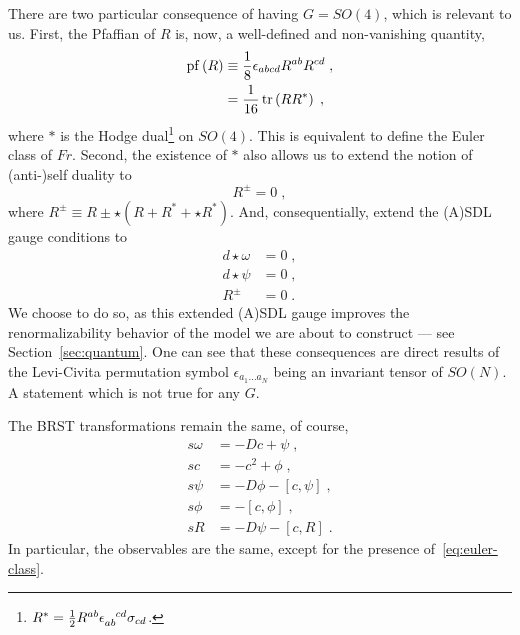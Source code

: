 \documentclass[../main.tex]{subfiles}
\begin{document}
There are two particular consequence of having $G=SO(4)$, which is relevant to us. First, the Pfaffian of $R$ is, now, a well-defined and non-vanishing quantity,
\begin{subequations}%
  \label{eq:euler-class}
  \begin{align}
    \operatorname{pf} \left( R \right) & \equiv \frac{ 1 }{ 8 } \epsilon_{abcd} R^{ab}R^{cd} \;, \\
                         & =\frac{ 1 }{ 16 } \operatorname{tr} \left( RR^* \right) \;,
  \end{align}
\end{subequations}
where $*$ is the Hodge dual\footnote{ $ R^* = \frac{ 1 }{ 2 } R^{ab}\tensor{ \epsilon }{_{ab}^{cd}} \sigma_{cd} $. } on $SO(4)$. This is equivalent to define the Euler class of $ Fr $. Second, the existence of $*$ also allows us to extend the notion of (anti-)self duality to
\begin{equation}
  \label{eq:extended-self-duality}
  R^{ \pm } = 0  \;,
\end{equation}
where $ R^{ \pm } \equiv R \pm \star \left( R + R^{ * } + \star R^{ * } \right) $. And, consequentially, extend the (A)SDL gauge conditions to
\begin{subequations}%
  \label{eq:extended-asdlg}
  \begin{align}
    d \star \omega & = 0 \;, \\
    d \star \psi   & = 0 \;, \\
    R^{ \pm }      & =0 \;.
  \end{align}
\end{subequations}
We choose to do so, as this extended (A)SDL gauge improves the renormalizability behavior of the model we are about to construct --- see Section~\ref{sec:quantum}. One can see that these consequences are direct results of the Levi-Civita permutation symbol $ \epsilon_{a_1 \ldots a_N} $ being an invariant tensor of $ SO(N) $. A statement which is not true for any $G$.

The BRST transformations remain the same, of course,
\begin{subequations}%
  \label{eq:top_grav_brst}
  \begin{align}
    s\omega & = -Dc + \psi \;,                      \\
    sc      & = - c^2 + \phi \;,                    \\
    s\psi   & = -D\phi - \left[ c, \psi \right] \;, \\
    s\phi   & = - \left[ c, \phi \right]\;,         \\
    sR      & = -D\psi - \left[ c, R \right] \;.
  \end{align}
\end{subequations}
In particular, the observables are the same, except for the presence of~\eqref{eq:euler-class}.
\end{document}
